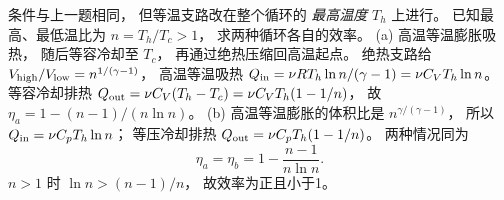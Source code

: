 条件与上一题相同，
但等温支路改在整个循环的
\emph{最高温度} $T_h$ 上进行。
已知最高、最低温比为
$n=T_h/T_c>1$，
求两种循环各自的效率。
\exsolution
(a) 高温等温膨胀吸热，
随后等容冷却至 $T_c$，
再通过绝热压缩回高温起点。
绝热支路给
$V_{\rm high}/V_{\rm low}
=n^{1/(\gamma-1)}$，
高温等温吸热
$Q_{\rm in}=\nu RT_h\ln n/(\gamma-1)
=\nu C_VT_h\ln n$。
等容冷却排热
$Q_{\rm out}=\nu C_V(T_h-T_c)
=\nu C_VT_h(1-1/n)$，
故
$\eta_a=1-(n-1)/(n\ln n)$。
(b) 高温等温膨胀的体积比是
$n^{\gamma/(\gamma-1)}$，
所以
$Q_{\rm in}=\nu C_pT_h\ln n$；
等压冷却排热
$Q_{\rm out}=\nu C_pT_h(1-1/n)$。
两种情况同为
\[
\boxed{\eta_a=\eta_b=1-\frac{n-1}{n\ln n}}.
\]
\excheck $n>1$ 时
$\ln n>(n-1)/n$，
故效率为正且小于1。
